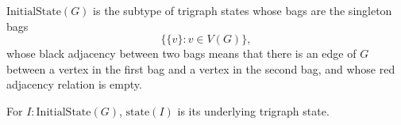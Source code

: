 \(\mathrm{InitialState}(G)\) is the subtype of trigraph states whose bags
are the singleton bags
\[
  \{\{v\}:v\in V(G)\},
\]
whose black adjacency between two bags means that there is an edge of \(G\)
between a vertex in the first bag and a vertex in the second bag, and whose red
adjacency relation is empty.

For \(I:\mathrm{InitialState}(G)\), \(\mathrm{state}(I)\) is its
underlying trigraph state.
